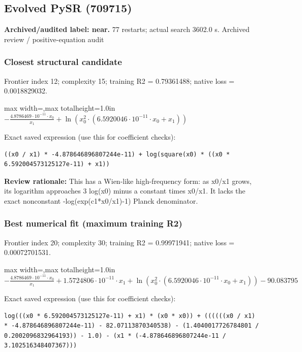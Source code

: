 \documentclass[10pt,letterpaper,landscape]{article}
\begin{document}
\begin{minipage}[t]{0.485\textwidth}
\subsection*{Evolved PySR (709715)}
\textbf{Archived/audited label: near.} 77 restarts; actual search 3602.0 s.
{\small Archived review / positive-equation audit}
\subsubsection*{Closest structural candidate}
Frontier index 12; complexity 15; training R2 = 0.79361488; native loss = 0.0018829032.
\begin{center}\begin{adjustbox}{max width=\linewidth,max totalheight=1.0in}$\displaystyle - \frac{4.8786469 \cdot 10^{-11} \cdot x_{0}}{x_{1}} + \ln{\left(x_{0}^{2} \cdot \left(6.5920046 \cdot 10^{-11} \cdot x_{0} + x_{1}\right) \right)}$\end{adjustbox}\end{center}
{\scriptsize Exact saved expression (use this for coefficient checks):}
\begin{lstlisting}
((x0 / x1) * -4.878646896807244e-11) + log(square(x0) * ((x0 * 6.592004573125127e-11) + x1))
\end{lstlisting}
{\small\textbf{Review rationale:} This has a Wien-like high-frequency form: as x0/x1 grows, its logarithm approaches 3 log(x0) minus a constant times x0/x1. It lacks the exact nonconstant -log(exp(c1*x0/x1)-1) Planck denominator.}
\subsubsection*{Best numerical fit (maximum training R2)}
Frontier index 20; complexity 30; training R2 = 0.99971941; native loss = 0.00072701531.
\begin{center}\begin{adjustbox}{max width=\linewidth,max totalheight=1.0in}$\displaystyle - \frac{4.8786469 \cdot 10^{-11} \cdot x_{0}}{x_{1}} + 1.5724806 \cdot 10^{-11} \cdot x_{1} + \ln{\left(x_{0}^{2} \cdot \left(6.5920046 \cdot 10^{-11} \cdot x_{0} + x_{1}\right) \right)} - 90.083795$\end{adjustbox}\end{center}
{\scriptsize Exact saved expression (use this for coefficient checks):}
\begin{lstlisting}
log(((x0 * 6.592004573125127e-11) + x1) * (x0 * x0)) + ((((((x0 / x1) * -4.878646896807244e-11) - 82.07113870340538) - (1.4040017726784801 / 0.2002096832964193)) - 1.0) - (x1 * (-4.878646896807244e-11 / 3.102516348407367)))
\end{lstlisting}
\end{minipage}
\clearpage{}\label{planck-10005}
\end{document}

